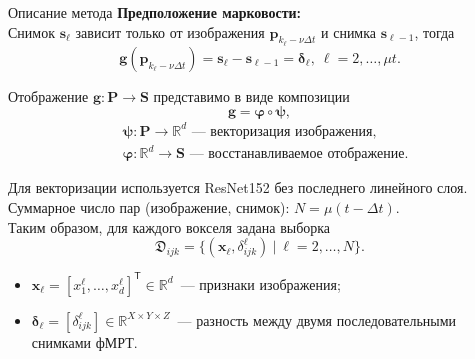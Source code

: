 \documentclass[10pt]{beamer}
\newcommand{\T}{^{\mathsf{T}}}
\begin{document}
\begin{frame}{Описание метода}
    \textbf{Предположение марковости:}\\
    Снимок $\mathbf{s}_{\ell}$ зависит только от изображения $\mathbf{p}_{k_\ell - \nu \Delta t}$
    и снимка $\mathbf{s}_{\ell-1}$, тогда
	\begin{equation*}
		\label{eq4}
		\mathbf{g}(\mathbf{p}_{k_{\ell} - \nu \Delta t}) = \mathbf{s}_{\ell} - \mathbf{s}_{\ell-1} = \bm{\delta}_{\ell}, \ \ell = 2, \ldots, \mu t.
	\end{equation*}

    Отображение $\mathbf{g}: \mathbf{P} \to \mathbf{S}$ представимо в виде композиции
    \[ \mathbf{g} = \bm{\varphi} \circ \bm{\psi}, \]
    \vspace{-0.8cm}
    \begin{align*}
        &\bm{\psi}: \mathbf{P} \to \mathbb{R}^d
        \text{~--- векторизация изображения,}\\
        &\bm{\varphi}: \mathbb{R}^d \to \mathbf{S}
        \text{~--- восстанавливаемое отображение.}
    \end{align*}

    Для векторизации используется ResNet152 без последнего линейного слоя.
    Суммарное число пар (изображение, снимок): $N = \mu (t - \Delta t)$.\\
    Таким образом, для каждого вокселя задана выборка
    \[ \mathfrak{D}_{ijk} = \{(\mathbf{x}_{\ell}, \delta^{\ell}_{ijk}) \ | \ {\ell} = 2, \ldots, N \}. \]
    \vspace{-0.5cm}
    \begin{itemize}
        \item $\mathbf{x}_{\ell} = [x^{\ell}_1, \ldots, x^{\ell}_{d}]\T \in \mathbb{R}^{d}$~--- признаки изображения;
        \item $\bm{\delta}_{\ell} = [\delta^{\ell}_{ijk}] \in \mathbb{R}^{X \times Y \times Z}$~--- разность между двумя последовательными снимками фМРТ.
    \end{itemize}

\end{frame}
\end{document}
